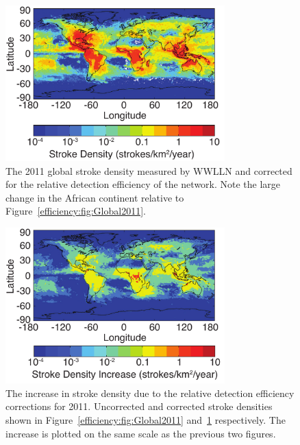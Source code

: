 \begin{figure}[ht!]
   \centering
\noindent\includegraphics[width=20pc]{efficiency/Figures/2012RS005049-p15.pdf} 
   \caption{The 2011 global stroke density measured by WWLLN and corrected for the relative detection efficiency of the network.
Note the large change in the African continent relative to Figure~\ref{efficiency:fig:Global2011}.}
   \label{efficiency:fig:Global2011Corrected}
\end{figure}

\begin{figure}[ht!]
   \centering
\noindent\includegraphics[width=20pc]{efficiency/Figures/2012RS005049-p16.pdf} 
   \caption{The increase in stroke density due to the relative detection efficiency corrections for 2011.
Uncorrected and corrected stroke densities shown in Figure~\ref{efficiency:fig:Global2011} and~\ref{efficiency:fig:Global2011Corrected} respectively.
The increase is plotted on the same scale as the previous two figures.}
   \label{efficiency:fig:Global2011Diff}
\end{figure}

